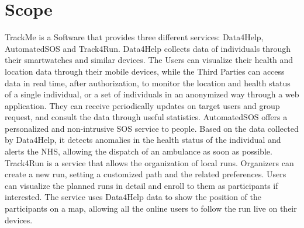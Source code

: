 \section{Scope}
 TrackMe is a Software that provides three different services: Data4Help, AutomatedSOS and Track4Run.
Data4Help collects data of individuals through their smartwatches and similar devices. The Users can visualize their health and location data through their mobile devices, while the Third Parties can access data in real time, after authorization, to monitor the location and health status of a single individual, or a set of individuals in an anonymized way through a web application. They can receive periodically updates on target users and group request, and consult the data through useful statistics.
AutomatedSOS offers a personalized and non-intrusive SOS service to  people. Based on the data collected by Data4Help, it detects anomalies in the health status of the individual and alerts the NHS, allowing the dispatch of an ambulance as soon as possible.
Track4Run is a service that allows the organization of local runs. Organizers can create a new run, setting a customized path and the related preferences. Users can visualize the planned runs in detail and enroll to them as participants if interested. The service uses Data4Help data to show the position of the participants on a map, allowing all the online users to follow the run live on their devices.

